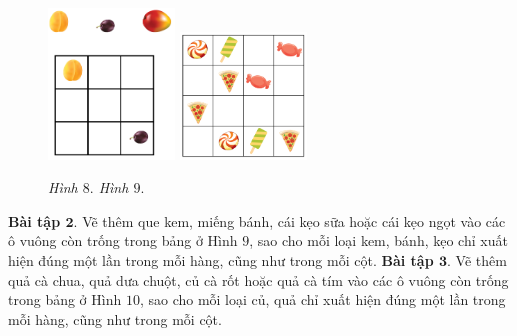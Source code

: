 	\begin{figure}[H]
		\vspace*{-5pt}
		\centering
		\captionsetup{labelformat=empty, justification=centering}
		\includegraphics[width=0.30\textwidth]{hinh8}\hspace{40pt}
		\includegraphics[width=0.30\textwidth]{hinh10}

		\caption{\textit{\small Hình $8.$ \hspace*{100pt} Hình $9.$}} %
		\vspace*{-10pt}
	\end{figure}
	\textbf{\color{toancuabi}Bài tập $\pmb{2.}$} Vẽ thêm que kem, miếng bánh, cái kẹo sữa hoặc cái kẹo ngọt vào các ô vuông còn trống trong bảng ở Hình $9$, sao cho mỗi loại kem, bánh, kẹo chỉ xuất hiện đúng một lần trong mỗi hàng, cũng như trong mỗi cột.
	\vskip 0.1cm
	\textbf{\color{toancuabi}Bài tập $\pmb{3.}$} Vẽ thêm quả cà chua, quả dưa chuột, củ cà rốt hoặc quả cà tím vào các ô vuông còn trống trong bảng ở Hình $10$, sao cho mỗi loại củ, quả chỉ xuất hiện đúng một lần trong mỗi hàng, cũng như trong mỗi cột.
